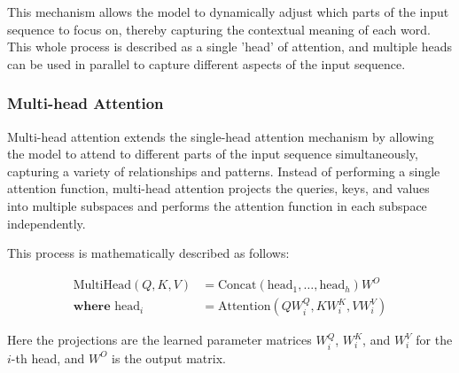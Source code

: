                 This mechanism allows the model to dynamically adjust which parts of the input sequence to focus on, thereby capturing the contextual meaning of each word. This whole process is described as a single 'head' of attention, and multiple heads can be used in parallel to capture different aspects of the input sequence.

            \subsubsection{Multi-head Attention}
                Multi-head attention extends the single-head attention mechanism by allowing the model to attend to different parts of the input sequence simultaneously, capturing a variety of relationships and patterns. Instead of performing a single attention function, multi-head attention projects the queries, keys, and values into multiple subspaces and performs the attention function in each subspace independently.

                This process is mathematically described as follows:

                \begin{align}
                    \text{MultiHead}(Q, K, V) &= \text{Concat}(\text{head}_1, \ldots, \text{head}_h)W^O \\
                    \textbf{where } \text{head}_i &= \text{Attention}(QW_i^Q, KW_i^K, VW_i^V)
                \end{align}

                Here the projections are the learned parameter matrices  \(W_i^Q\), \(W_i^K\), and \(W_i^V\) for the \(i\)-th head, and \(W^O\) is the output matrix.

